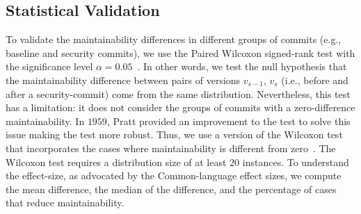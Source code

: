 \documentclass[10pt,conference]{IEEEtran}
\begin{document}
%
%
%
%

\subsection{Statistical Validation}\label{sec:statsval}
%
To validate the maintainability differences in different groups of commits
(e.g., baseline and security commits), we use the Paired Wilcoxon signed-rank
test with the significance level $\alpha = 0.05$~\cite{10.2307/3001968}. In
other words, we test the null hypothesis that the maintainability difference
between pairs of versions $v_{s-1}$, $v_s$ (i.e., before and after a
security-commit) come from the same distribution. Nevertheless, this test 
has a limitation: it does not consider the groups of commits with a 
zero-difference maintainability. In $1959$, Pratt provided an improvement to 
the test to solve this issue making the test more robust. Thus, we use a 
version of the Wilcoxon test that incorporates the cases where 
maintainability is different from zero~\cite{10.2307/2282543}.
The Wilcoxon test requires a distribution size of at least $20$ instances.
To understand the effect-size, as advocated by the Common-language effect 
sizes\cite{graw:1992}, we compute the mean difference, the median of the 
difference, and the percentage of cases that reduce maintainability.
%
\end{document}

